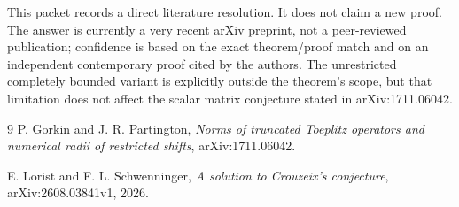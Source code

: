 \documentclass[11pt]{article}
\begin{document}
This packet records a direct literature resolution. It does not claim a new proof. The answer is currently a very recent arXiv preprint, not a peer-reviewed publication; confidence is based on the exact theorem/proof match and on an independent contemporary proof cited by the authors. The unrestricted completely bounded variant is explicitly outside the theorem's scope, but that limitation does not affect the scalar matrix conjecture stated in arXiv:1711.06042.

\begin{thebibliography}{9}
P. Gorkin and J. R. Partington,
\emph{Norms of truncated Toeplitz operators and numerical radii of restricted shifts},
arXiv:1711.06042.

E. Lorist and F. L. Schwenninger,
\emph{A solution to Crouzeix's conjecture},
arXiv:2608.03841v1, 2026.
\end{thebibliography}
\end{document}
